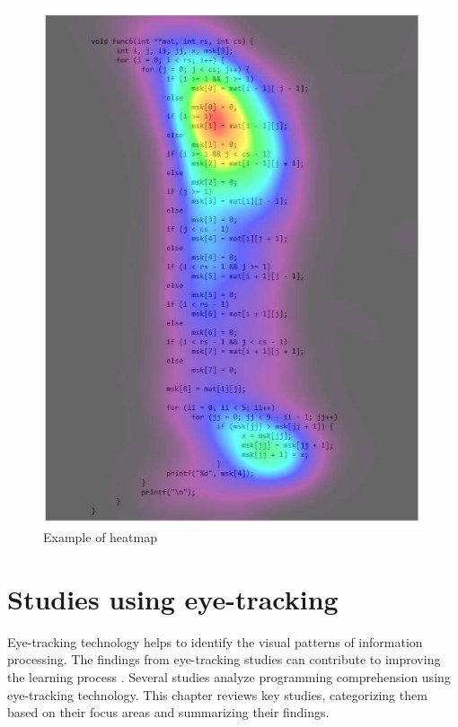 \begin{figure} [H]
  \centering
  \includegraphics[scale=1]{figures/hm.png}
  \caption{Example of heatmap \cite[p. 13]{jbara2017programmers}}
  \label{fig:AnhangsChor}
\end{figure}



\section{Studies using eye-tracking}


Eye-tracking technology helps to identify the visual patterns of information processing. 
The findings from eye-tracking studies can contribute to improving the learning process \cite{andrzejewska2020development}. Several studies analyze programming comprehension using eye-tracking technology. This chapter reviews key studies, categorizing them based on their focus areas and summarizing their findings.

